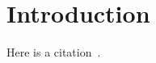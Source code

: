 \chapter[Introduction][Introduction]{Introduction}

Here is a citation~\cite{1999.ATLAS.Physics-TDR}.


